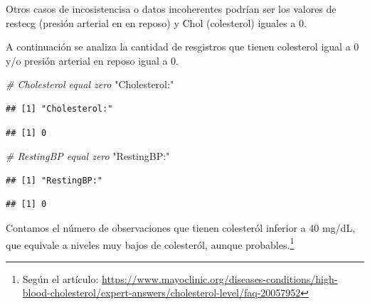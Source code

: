 \documentclass[
]{article}
\newenvironment{Shaded}{\begin{snugshade}}{\end{snugshade}}
\newcommand{\CommentTok}[1]{\textcolor[rgb]{0.56,0.35,0.01}{\textit{#1}}}
\newcommand{\DecValTok}[1]{\textcolor[rgb]{0.00,0.00,0.81}{#1}}
\newcommand{\FunctionTok}[1]{\textcolor[rgb]{0.13,0.29,0.53}{\textbf{#1}}}
\newcommand{\NormalTok}[1]{#1}
\newcommand{\SpecialCharTok}[1]{\textcolor[rgb]{0.81,0.36,0.00}{\textbf{#1}}}
\newcommand{\StringTok}[1]{\textcolor[rgb]{0.31,0.60,0.02}{#1}}
\begin{document}
Otros casos de incosistencisa o datos incoherentes podrían ser los
valores de restecg (presión arterial en en reposo) y Chol (colesterol)
iguales a 0.

A continuación se analiza la cantidad de resgistros que tienen
colesterol igual a 0 y/o presión arterial en reposo igual a 0.

\begin{Shaded}
\begin{Highlighting}[]
\CommentTok{\# Cholesterol equal zero}
\StringTok{"Cholesterol:"}
\end{Highlighting}
\end{Shaded}

\begin{verbatim}
## [1] "Cholesterol:"
\end{verbatim}

\begin{Shaded}
\end{Shaded}

\begin{verbatim}
## [1] 0
\end{verbatim}

\begin{Shaded}
\begin{Highlighting}[]
\CommentTok{\# RestingBP equal zero}
\StringTok{"RestingBP:"}
\end{Highlighting}
\end{Shaded}

\begin{verbatim}
## [1] "RestingBP:"
\end{verbatim}

\begin{Shaded}
\end{Shaded}

\begin{verbatim}
## [1] 0
\end{verbatim}

Contamos el número de observaciones que tienen colesteról inferior a 40
mg/dL, que equivale a niveles muy bajos de colesteról, aunque
probables.\footnote{Según el artículo:
  \url{https://www.mayoclinic.org/diseases-conditions/high-blood-cholesterol/expert-answers/cholesterol-level/faq-20057952}}
\end{document}
